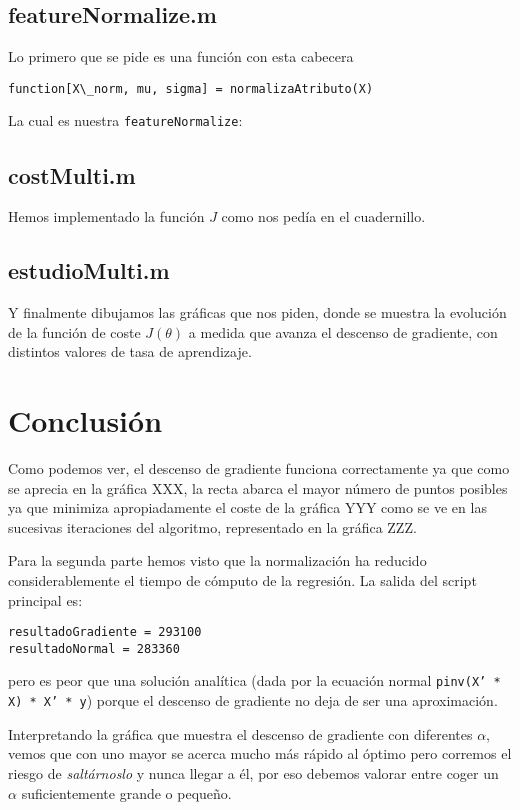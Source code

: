 \documentclass{article}
\begin{document}
\subsection{featureNormalize.m}
Lo primero que se pide es una función con esta cabecera
\begin{lstlisting}[style=snippet]
function[X\_norm, mu, sigma] = normalizaAtributo(X)
\end{lstlisting}
La cual es nuestra {\tt featureNormalize}:


\subsection{costMulti.m}
Hemos implementado la función $J$ como nos pedía en el cuadernillo.


\subsection{estudioMulti.m}
Y finalmente dibujamos las gráficas que nos piden, donde se muestra la evolución de la función de coste $J(\theta)$ a medida que avanza el descenso de gradiente, con distintos valores de tasa de aprendizaje.


\section{Conclusión}
Como podemos ver, el descenso de gradiente funciona correctamente ya que como se aprecia en la gráfica XXX, la recta abarca el mayor número de puntos posibles ya que minimiza apropiadamente el coste de la gráfica YYY como se ve en las sucesivas iteraciones del algoritmo, representado en la gráfica ZZZ.
\vspace{3mm}

Para la segunda parte hemos visto que la normalización ha reducido considerablemente el tiempo de cómputo de la regresión.
La salida del script principal es:
\begin{lstlisting}[style=snippet]
resultadoGradiente = 293100
resultadoNormal = 283360
\end{lstlisting}
pero es peor que una solución analítica (dada por la ecuación normal {\tt pinv(X' * X) * X' * y}) porque el descenso de gradiente no deja de ser una aproximación.

Interpretando la gráfica que muestra el descenso de gradiente con diferentes $\alpha$, vemos que con uno mayor se acerca mucho más rápido al óptimo pero corremos el riesgo de {\it saltárnoslo} y nunca llegar a él, por eso debemos valorar entre coger un $\alpha$ suficientemente grande o pequeño.
\end{document}
